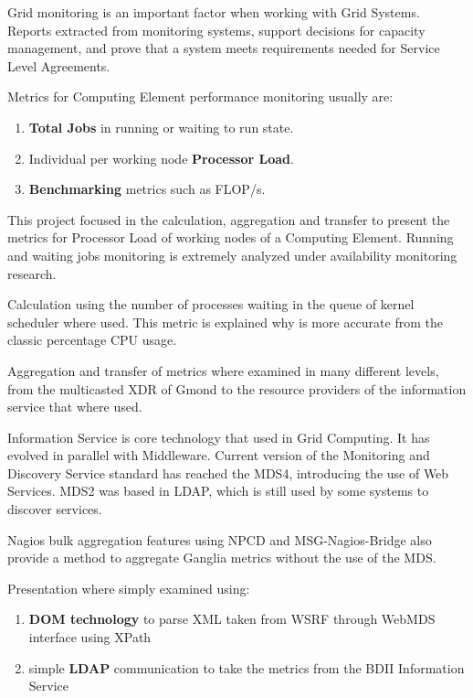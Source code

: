 
Grid monitoring is an important factor when working with Grid Systems. Reports extracted from monitoring systems, support decisions for capacity management, and prove that a system meets requirements needed for Service Level Agreements.

Metrics for Computing Element performance monitoring usually are:

\begin{enumerate}
 \item {\bf Total Jobs} in running or waiting to run state.
 \item Individual per working node {\bf Processor Load}.
 \item {\bf Benchmarking} metrics such as FLOP/s.
\end{enumerate}

This project focused in the calculation, aggregation and transfer to present the metrics for Processor Load of working nodes of a Computing Element. Running and waiting jobs monitoring is extremely analyzed under availability monitoring research.

Calculation using the number of processes waiting in the queue of kernel scheduler where used. This metric is explained why is more accurate from the classic percentage CPU usage.

Aggregation and transfer of metrics where examined in many different levels, from the multicasted XDR of Gmond to the resource providers of the information service that where used.

Information Service is core technology that used in Grid Computing. It has evolved in parallel with Middleware. Current version of the Monitoring and Discovery Service standard has reached the MDS4, introducing the use of Web Services. MDS2 was based in LDAP, which is still used by some systems to discover services.

Nagios bulk aggregation features using NPCD and MSG-Nagios-Bridge also provide a method to aggregate Ganglia metrics without the use of the MDS.

Presentation where simply examined using:

\begin{enumerate}
 \item {\bf DOM technology} to parse XML taken from WSRF through WebMDS interface using XPath
 \item simple {\bf LDAP} communication to take the metrics from the BDII Information Service
\end{enumerate}


